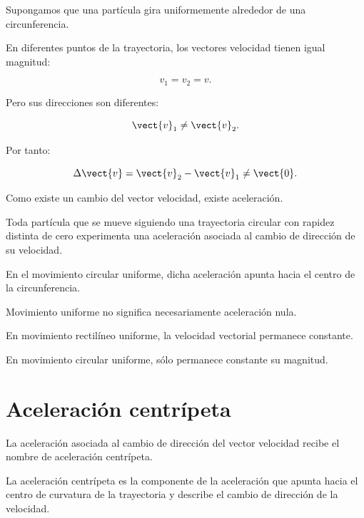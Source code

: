 Supongamos que una partícula gira uniformemente alrededor de una circunferencia.

En diferentes puntos de la trayectoria, los vectores velocidad tienen igual
magnitud:

\[
v_1=v_2=v.
\]

Pero sus direcciones son diferentes:

\[
\vect{v}_1\neq\vect{v}_2.
\]

Por tanto:

\[
\Delta\vect{v}
=
\vect{v}_2-\vect{v}_1
\neq\vect{0}.
\]

Como existe un cambio del vector velocidad, existe aceleración.

\begin{principio}

Toda partícula que se mueve siguiendo una trayectoria circular con rapidez
distinta de cero experimenta una aceleración asociada al cambio de dirección de
su velocidad.

En el movimiento circular uniforme, dicha aceleración apunta hacia el centro
de la circunferencia.

\end{principio}

\begin{idea}

Movimiento uniforme no significa necesariamente aceleración nula.

En movimiento rectilíneo uniforme, la velocidad vectorial permanece constante.

En movimiento circular uniforme, sólo permanece constante su magnitud.

\end{idea}


\section{Aceleración centrípeta}

La aceleración asociada al cambio de dirección del vector velocidad recibe el
nombre de aceleración centrípeta.

\begin{definicion}

La aceleración centrípeta es la componente de la aceleración que apunta hacia
el centro de curvatura de la trayectoria y describe el cambio de dirección de
la velocidad.

\end{definicion}

